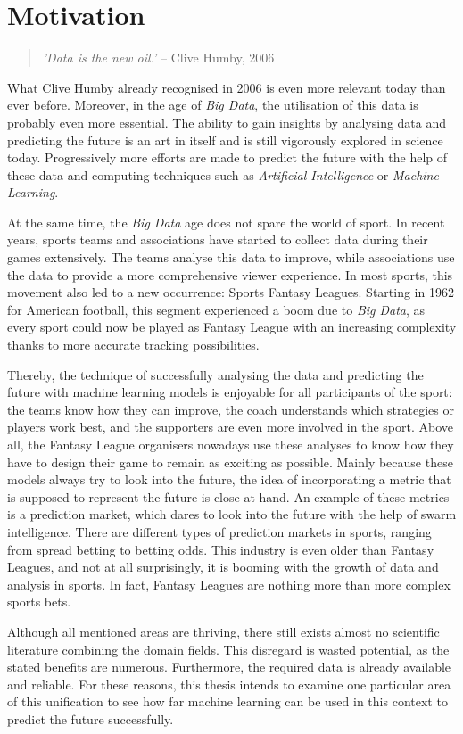 \section{Motivation}

\begin{quote}
    \begin{center}
        \emph{'Data is the new oil.'}   -- Clive Humby, 2006
    \end{center}
\end{quote}

What Clive Humby already recognised in 2006 is even more relevant today than ever before. Moreover, in the age of \emph{Big Data}, the utilisation of this data is probably even more essential. The ability to gain insights by analysing data and predicting the future is an art in itself and is still vigorously explored in science today. Progressively more efforts are made to predict the future with the help of these data and computing techniques such as \emph{Artificial Intelligence} or \emph{Machine Learning}.

At the same time, the \emph{Big Data} age does not spare the world of sport. \parencite[cf.][]{rein_big_2016} In recent years, sports teams and associations have started to collect data during their games extensively. The teams analyse this data to improve, while associations use the data to provide a more comprehensive viewer experience. In most sports, this movement also led to a new occurrence: Sports Fantasy Leagues. Starting in 1962 for American football, this segment experienced a boom due to \emph{Big Data}, as every sport could now be played as Fantasy League with an increasing complexity thanks to more accurate tracking possibilities.

\clearpage Thereby, the technique of successfully analysing the data and predicting the future with machine learning models is enjoyable for all participants of the sport: the teams know how they can improve, the coach understands which strategies or players work best, and the supporters are even more involved in the sport. Above all, the Fantasy League organisers nowadays use these analyses to know how they have to design their game to remain as exciting as possible. Mainly because these models always try to look into the future, the idea of incorporating a metric that is supposed to represent the future is close at hand. An example of these metrics is a prediction market, which dares to look into the future with the help of swarm intelligence. There are different types of prediction markets in sports, ranging from spread betting to betting odds. This industry is even older than Fantasy Leagues, and not at all surprisingly, it is booming with the growth of data and analysis in sports. In fact, Fantasy Leagues are nothing more than more complex sports bets. 

Although all mentioned areas are thriving, there still exists almost no scientific literature combining the domain fields. This disregard is wasted potential, as the stated benefits are numerous. Furthermore, the required data is already available and reliable. For these reasons, this thesis intends to examine one particular area of this unification to see how far machine learning can be used in this context to predict the future successfully. 
